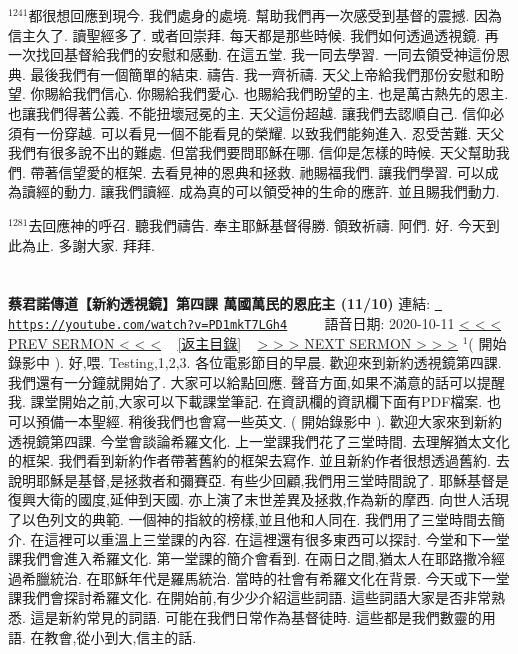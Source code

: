 \documentclass{book}
\begin{document}
$^{1241}$都很想回應到現今.
我們處身的處境.
幫助我們再一次感受到基督的震撼.
因為信主久了.
讀聖經多了.
或者回崇拜.
每天都是那些時候.
我們如何透過透視鏡.
再一次找回基督給我們的安慰和感動.
在這五堂.
我一同去學習.
一同去領受神這份恩典.
最後我們有一個簡單的結束.
禱告.
我一齊祈禱.
天父上帝給我們那份安慰和盼望.
你賜給我們信心.
你賜給我們愛心.
也賜給我們盼望的主.
也是萬古熱先的恩主.
也讓我們得著公義.
不能扭壞冠冕的主.
天父這份超越.
讓我們去認順自己.
信仰必須有一份穿越.
可以看見一個不能看見的榮耀.
以致我們能夠進入.
忍受苦難.
天父我們有很多說不出的難處.
但當我們要問耶穌在哪.
信仰是怎樣的時候.
天父幫助我們.
帶著信望愛的框架.
去看見神的恩典和拯救.
祂賜福我們.
讓我們學習.
可以成為讀經的動力.
讓我們讀經.
成為真的可以領受神的生命的應許.
並且賜我們動力.

$^{1281}$去回應神的呼召.
聽我們禱告.
奉主耶穌基督得勝.
領致祈禱.
阿們.
好.
今天到此為止.
多謝大家.
拜拜.
\newpage



\section{}
\label{sec:PD1mkT7LGh4}
\textbf{蔡君諾傳道【新約透視鏡】第四課  萬國萬民的恩庇主 (11/10)}
\newline
\newline
連結: \href{https://youtube.com/watch?v=PD1mkT7LGh4}{\texttt{ https://youtube.com/watch?v=PD1mkT7LGh4}} ~~~~ 語音日期: 2020-10-11 
\newline
\newline
\hyperref[sec:MITfS88PZDg]{\small{< < < PREV SERMON < < <}}
~
\hyperref[sec:index]{\small{[返主目錄]}}
~
\hyperref[sec:qH7MtIb583Y]{\small{> > > NEXT SERMON > > >}}
\newline
\newline
$^{1}$( 開始錄影中 ).
好,喂.
Testing,1,2,3.
各位電影節目的早晨.
歡迎來到新約透視鏡第四課.
我們還有一分鐘就開始了.
大家可以給點回應.
聲音方面,如果不滿意的話可以提醒我.
課堂開始之前,大家可以下載課堂筆記.
在資訊欄的資訊欄下面有PDF檔案.
也可以預備一本聖經.
稍後我們也會寫一些英文.
( 開始錄影中 ).
歡迎大家來到新約透視鏡第四課.
今堂會談論希羅文化.
上一堂課我們花了三堂時間.
去理解猶太文化的框架.
我們看到新約作者帶著舊約的框架去寫作.
並且新約作者很想透過舊約.
去說明耶穌是基督,是拯救者和彌賽亞.
有些少回顧,我們用三堂時間說了.
耶穌基督是復興大衛的國度,延伸到天國.
亦上演了末世差異及拯救,作為新的摩西.
向世人活現了以色列文的典範.
一個神的指紋的榜樣,並且他和人同在.
我們用了三堂時間去簡介.
在這裡可以重溫上三堂課的內容.
在這裡還有很多東西可以探討.
今堂和下一堂課我們會進入希羅文化.
第一堂課的簡介會看到.
在兩日之間,猶太人在耶路撒冷經過希臘統治.
在耶穌年代是羅馬統治.
當時的社會有希羅文化在背景.
今天或下一堂課我們會探討希羅文化.
在開始前,有少少介紹這些詞語.
這些詞語大家是否非常熟悉.
這是新約常見的詞語.
可能在我們日常作為基督徒時.
這些都是我們數靈的用語.
在教會,從小到大,信主的話.
\end{document}
